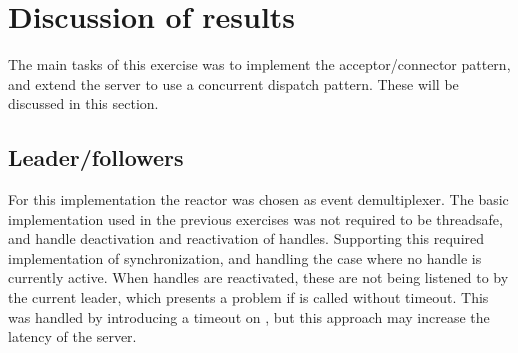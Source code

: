 \documentclass[Main]{subfiles}
\begin{document}
\chapter{Discussion of results}

The main tasks of this exercise was to implement the acceptor/connector pattern, and extend the server to use a concurrent dispatch pattern. These will be discussed in this section.

\section*{Leader/followers}

For this implementation the reactor was chosen as event demultiplexer. The basic implementation used in the previous exercises was not required to be threadsafe, and handle deactivation and reactivation of handles. Supporting this required implementation of synchronization, and handling the case where no handle is currently active. When handles are reactivated, these are not being listened to by the current leader, which presents a problem if  is called without timeout. This was handled by introducing a timeout on , but this approach may increase the latency of the server. 
\end{document}
